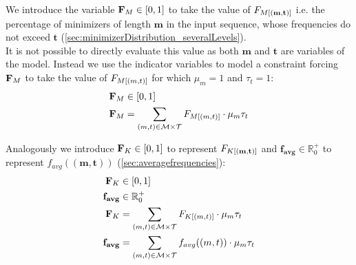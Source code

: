 \documentclass[a4paper,titlepage,onecolumn,oneside,12pt,nenglish,titlepage=firstiscover]{scrbook}
\theoremstyle{plain} %
\theoremstyle{definition} %
\theoremstyle{remark} %
\theoremstyle{plain}
\newcommand{\RR}{\mathbb{R}} %
\newcommand{\minimizerLength}{m}
\newcommand{\threshold}{t}
\newcommand{\varAverageFrequency}{\textbf{f}_{\textbf{avg}}}
\newcommand{\averageFrequency}{f_{avg}}
\newcommand{\possibleMinimizerLengths}{\mathcal{M}}
\newcommand{\possibleThresholds}{\mathcal{T}}
\newcommand{\indicatorm}{\mu}
\newcommand{\indicatort}{\tau}
\newcommand{\varMinimizerLength}{\textbf{\minimizerLength}}
\newcommand{\varThreshold}{\textbf{\threshold}}
\begin{document}
We introduce the variable $\textbf{F}_{M} \in [0,1]$ to take the value of $\CDF{\compactZV{M}{(\varMinimizerLength, \varThreshold)}}$ i.e. the percentage of minimizers of length $\varMinimizerLength$ in the input sequence, whose frequencies do not exceed $\varThreshold$ (\cref{sec:minimizerDistribution_severalLevels}).\\
It is not possible to directly evaluate this value as both $\varMinimizerLength$ and $\varThreshold$ are variables of the model. Instead we use the indicator variables to model a constraint forcing $\textbf{F}_{M}$ to take the value of $\CDF{\compactZV{M}{(\minimizerLength, \threshold)}}$ for which $\indicatorm_\minimizerLength = 1$ and $\indicatort_\threshold = 1$:
\newcommand{\cdfMExpression}{
	\varCDF{M} &= \sum\limits_{(\minimizerLength, \threshold) \in \possibleMinimizerLengths \times \possibleThresholds} \CDF{\compactZV{M}{(\minimizerLength, \threshold)}} \cdot
	\indicatorm_\minimizerLength \indicatort_\threshold
}
\begin{align}
	\varCDF{M} &\in [0,1] \label{variable:percMinimizers}\\
	\cdfMExpression \label{constraint:percMinimizers}
\end{align}

Analogously we introduce $\textbf{F}_{K} \in [0,1]$ to represent $\CDF{\compactZV{K}{(\varMinimizerLength, \varThreshold)}}$ and $\varAverageFrequency \in \RR^+_0$ to represent $\averageFrequency((\varMinimizerLength, \varThreshold))$ (\cref{sec:averagefrequencies}):
\newcommand{\cdfKExpression}{
	\varCDF{K} &= \sum\limits_{(\minimizerLength, \threshold) \in \possibleMinimizerLengths \times \possibleThresholds} \CDF{\compactZV{K}{(\minimizerLength, \threshold)}} \cdot
	\indicatorm_\minimizerLength \indicatort_\threshold
}
\newcommand{\varAverageFrequencyExpression}{
	\varAverageFrequency &= \sum\limits_{(\minimizerLength, \threshold) \in \possibleMinimizerLengths \times \possibleThresholds} \averageFrequency((\minimizerLength,\threshold)) \cdot
	\indicatorm_\minimizerLength \indicatort_\threshold
}
\begin{align}
	\varCDF{K} &\in [0,1] \label{variable:percKmers}\\
	\varAverageFrequency &\in \RR^+_0 \label{variable:averageFrequency}\\
	\cdfKExpression \label{constraint:percKmers}\\
	\varAverageFrequencyExpression \label{constraint:averageFrequency}
\end{align}
\end{document}
